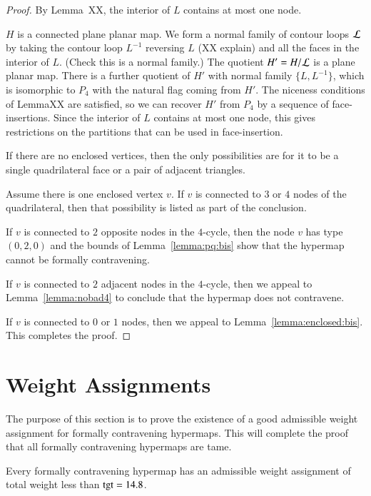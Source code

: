 \begin{proof}
By Lemma~XX, the interior of $L$ contains at most one node.

$H$ is a connected plane planar map.  We form a normal family of
contour loops ${\cal L}$ by taking the contour loop $L^{-1}$
reversing $L$ (XX explain) and all the faces in the interior of $L$.
(Check this is a normal family.)  The quotient $H' = H/{\cal L}$ is
a plane planar map.  There is a further quotient of $H'$ with normal
family $\{L,L^{-1}\}$, which is isomorphic to $P_4$ with the natural
flag coming from $H'$.  The niceness conditions of LemmaXX are
satisfied, so we can recover $H'$ from $P_4$ by a sequence of
face-insertions.  Since the interior of $L$ contains at most one
node, this gives restrictions on the partitions that can be used in
face-insertion.

If there are no enclosed vertices, then the only possibilities are
for it to be a single quadrilateral face or a pair of adjacent
triangles.

Assume there is one enclosed vertex $v$.  If $v$ is connected to $3$
or $4$ nodes of the quadrilateral, then that possibility is listed
as part of the conclusion.

If $v$ is connected to $2$ opposite nodes in the $4$-cycle, then the
node $v$ has type $(0,2,0)$ and the bounds of
Lemma~\ref{lemma:pq:bis} show that the hypermap cannot be formally
contravening.

If $v$ is connected to $2$ adjacent nodes in the $4$-cycle, then we
appeal to Lemma~\ref{lemma:nobad4} to conclude that the hypermap
does not contravene.

If $v$ is connected to $0$ or $1$ nodes, then we appeal to
Lemma~\ref{lemma:enclosed:bis}.  This completes the proof.
\end{proof}

\section{Weight Assignments}
    \label{sec:weight}

The purpose of this section is to prove the existence of a good
admissible weight assignment for formally contravening hypermaps.
This will complete the proof that all formally contravening
hypermaps are tame.

\begin{theorem}  Every formally contravening hypermap has an admissible
weight assignment of total weight less than ${\operatorname{tgt}}=14.8$.
\end{theorem}


